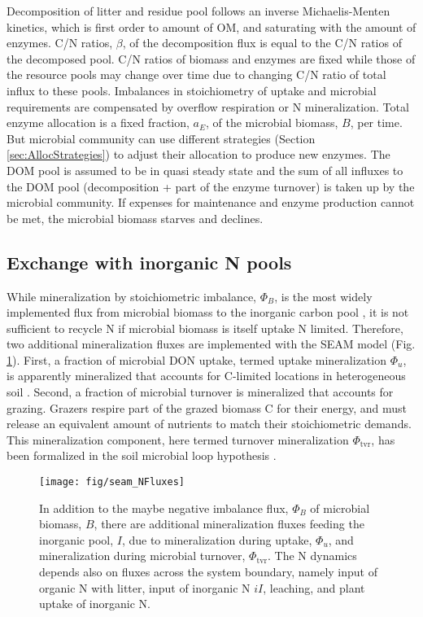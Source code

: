  

Decomposition of litter and residue pool follows an inverse Michaelis-Menten
kinetics, which is first order to amount of OM, and saturating with the amount
of enzymes. C/N ratios, $\beta$, of the decomposition flux is equal to the C/N
ratios of the decomposed pool. C/N ratios of biomass and enzymes are fixed while
those of the resource pools may change over time due to changing C/N ratio of
total influx to these pools. Imbalances in stoichiometry of uptake and microbial
requirements are compensated by overflow respiration or N mineralization.
Total enzyme allocation is a fixed fraction, $a_E$, of the microbial biomass,
$B$, per time. But microbial community can use different strategies (Section
\ref{sec:AllocStrategies}) to adjust their allocation to produce new enzymes.
The DOM pool is assumed to be in quasi steady state and the sum of all
influxes to the DOM pool (decomposition + part of the enzyme turnover) is taken
up by the microbial community. If expenses for maintenance and enzyme production
cannot be met, the microbial biomass starves and declines.

\subsection{Exchange with inorganic N pools}

While mineralization by stoichiometric imbalance, $\Phi_B$, is the most widely
implemented flux from microbial biomass to the inorganic carbon pool
\citep{Manzoni09}, it is not sufficient to recycle N if microbial biomass is
itself uptake N limited. Therefore, two additional mineralization fluxes are
implemented with the SEAM model (Fig. \ref{fig:SEAMStructNFluxes}). First, a
fraction of microbial DON uptake, termed uptake mineralization $\Phi_u$, is
apparently mineralized that accounts for C-limited locations in heterogeneous
soil \citep{Manzoni08}.
Second, a fraction of microbial turnover is mineralized that accounts for
grazing. Grazers respire part of the grazed biomass C for their energy, and
must release an equivalent amount of nutrients to match their stoichiometric
demands. This mineralization component, here termed turnover mineralization
$\Phi_{\operatorname{tvr}}$, has been formalized in the soil microbial loop
hypothesis \citep{Clarholm85, Raynaud06}.

\begin{figure}[t] \vspace*{2mm}
\begin{center}
\texttt{[image: fig/seam\_NFluxes]} 
\end{center}
\caption{
In addition to the maybe negative imbalance flux, $\Phi_B$ of microbial biomass,
$B$, there are additional mineralization fluxes feeding the inorganic pool, $I$,
due to mineralization during uptake, $\Phi_u$, and mineralization during
microbial turnover, $\Phi_{\operatorname{tvr}}$. The N dynamics depends also on
fluxes across the system boundary, namely input of organic N with litter, input
of inorganic N $iI$, leaching, and plant uptake of inorganic N.
\label{fig:SEAMStructNFluxes}}
\end{figure}

